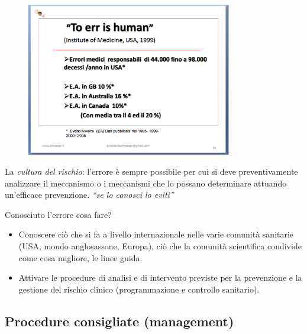 \begin{figure}[!ht]
\centering
	\includegraphics[width=0.8\textwidth]{30/image3.png}
	\end{figure}

La
\emph{cultura del rischio}: l'errore è sempre possibile per cui si deve
preventivamente analizzare il meccanismo o i meccanismi che lo possano
determinare attuando un'efficace prevenzione. \emph{``se lo conosci lo
eviti''}

Conosciuto l'errore cosa fare?

\begin{itemize}
\item
  Conoscere ciò che si fa a livello internazionale nelle varie comunità
  sanitarie (USA, mondo anglosassone, Europa), ciò che la comunità
  scientifica condivide come cosa migliore, le linee guida.
\item
  Attivare le procedure di analisi e di intervento previste per la
  prevenzione e la gestione del rischio clinico (programmazione e
  controllo sanitario).
\end{itemize}

\subsection{Procedure consigliate (management)}

